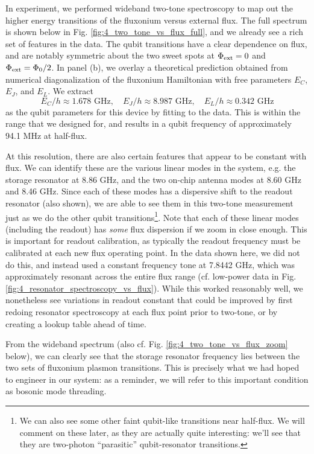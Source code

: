 In experiment, we performed wideband two-tone spectroscopy to map out the higher energy transitions of the fluxonium versus external flux. The full spectrum is shown below in Fig. \ref{fig:4_two_tone_vs_flux_full}, and we already see a rich set of features in the data. The qubit transitions have a clear dependence on flux, and are notably symmetric about the two sweet spots at $\Phi_{\rm ext} = 0$ and $\Phi_{\rm ext} = \Phi_0/2$. In panel (b), we overlay a theoretical prediction obtained from numerical diagonalization of the fluxonium Hamiltonian with free parameters $E_C$, $E_J$, and $E_L$. We extract
\begin{equation}
    E_C/h \approx 1.678 \,\, \text{GHz}, \quad  E_J/h \approx 8.987 \,\, \text{GHz}, \quad  E_L/h \approx 0.342 \,\, \text{GHz} 
    \label{eq:4_qubit_parameters_fit}
\end{equation}
as the qubit parameters for this device by fitting to the data. This is within the range that we designed for, and results in a qubit frequency of approximately 94.1 MHz at half-flux. 

At this resolution, there are also certain features that appear to be constant with flux. We can identify these are the various linear modes in the system, e.g. the storage resonator at 8.86 GHz, and the two on-chip antenna modes at 8.60 GHz and 8.46 GHz. Since each of these modes has a dispersive shift to the readout resonator (also shown), we are able to see them in this two-tone measurement just as we do the other qubit transitions\footnote{We can also see some other faint qubit-like transitions near half-flux. We will comment on these later, as they are actually quite interesting: we'll see that they are two-photon ``parasitic'' qubit-resonator transitions.}. Note that each of these linear modes (including the readout) has \textit{some} flux dispersion if we zoom in close enough. This is important for readout calibration, as typically the readout frequency must be calibrated at each new flux operating point. In the data shown here, we did not do this, and instead used a constant frequency tone at 7.8442 GHz, which was approximately resonant across the entire flux range (cf. low-power data in Fig. \ref{fig:4_resonator_spectroscopy_vs_flux}). While this worked reasonably well, we nonetheless see variations in readout constant that could be improved by first redoing resonator spectroscopy at each flux point prior to two-tone, or by creating a lookup table ahead of time. 

From the wideband spectrum (also cf. Fig. \ref{fig:4_two_tone_vs_flux_zoom} below), we can clearly see that the storage resonator frequency lies between the two sets of fluxonium plasmon transitions. This is precisely what we had hoped to engineer in our system: as a reminder, we will refer to this important condition as bosonic mode threading. 

